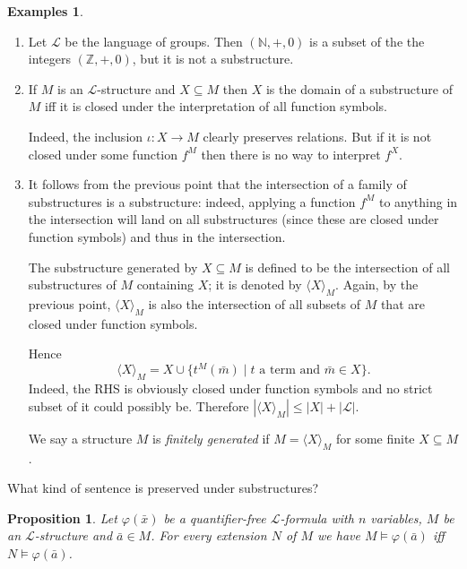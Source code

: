 \documentclass{report}
\theoremstyle{definition}
\theoremstyle{plain}
\newtheorem{prop}[thm]{Proposition}
\theoremstyle{definition}
\newtheorem{egs}[thm]{Examples}
\begin{document}
	\begin{egs}\leavevmode
		\begin{enumerate}
			\item Let $\mathcal{L}$ be the language of groups. Then $(\mathbb{N},+,0)$ is a subset of the the integers $(\mathbb{Z},+,0)$, but it is not a substructure.
			\item If $M$ is an $\mathcal{L}$-structure and $X\subseteq M$ then $X$ is the domain of a substructure of $M$ iff it is closed under the interpretation of all function symbols.
			
			Indeed, the inclusion $\iota\colon X \to M$ clearly preserves relations. But if it is not closed under some function $f^M$ then there is no way to interpret $f^X$. 
			\item It follows from the previous point that the intersection of a family of substructures is a substructure: indeed, applying a function $f^M$ to anything in the intersection will land on all substructures (since these are closed under function symbols) and thus in the intersection.
			
			The substructure generated by $X\subseteq M$ is defined to be the intersection of all substructures of $M$ containing $X$; it is denoted by $\langle X\rangle_{M}$. Again, by the previous point, $\langle X\rangle_M$ is also the intersection of all subsets of $M$ that are closed under function symbols.
			
			Hence
			\[
				\langle X\rangle_{M} = X \cup \{t^M(\bar{m})\mid t\text{ a term and }\bar{m}\in X\}.
			\]
			Indeed, the RHS is obviously closed under function symbols and no strict subset of it could possibly be. Therefore $|\langle X \rangle_{M}| \leq |X| + |\mathcal{L}|$.
			
			We say a structure $M$ is \emph{finitely generated} if $M = \langle X \rangle_M$ for some finite $X\subseteq M$.
		\end{enumerate}
	\end{egs}
	What kind of sentence is preserved under substructures?
	\begin{prop}\label{prop:qf_preser_substr}
		Let $\varphi(\bar{x})$ be a quantifier-free $\mathcal{L}$-formula with $n$ variables, $M$ be an $\mathcal{L}$-structure and $\bar{a}\in M$. For every extension $N$ of $M$ we have $M \models \varphi(\bar{a})$ iff $N\models \varphi(\bar{a})$.
	\end{prop}
\end{document}
